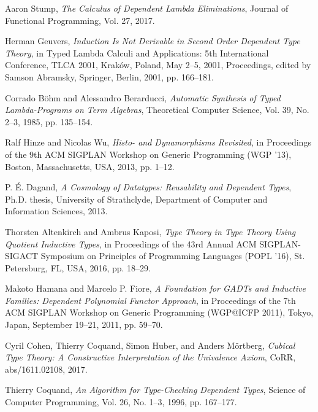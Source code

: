 \documentclass{article}
\begin{document}
\begin{thebibliography}{99}
Aaron Stump,
\textit{The Calculus of Dependent Lambda Eliminations},
Journal of Functional Programming, Vol. 27, 2017.

Herman Geuvers,
\textit{Induction Is Not Derivable in Second Order Dependent Type Theory},
in Typed Lambda Calculi and Applications: 5th International Conference, TLCA 2001, Kraków, Poland, May 2–5, 2001, Proceedings,
edited by Samson Abramsky,
Springer, Berlin, 2001, pp. 166--181.

Corrado Böhm and Alessandro Berarducci,
\textit{Automatic Synthesis of Typed Lambda-Programs on Term Algebras},
Theoretical Computer Science, Vol. 39, No. 2--3, 1985, pp. 135--154.

Ralf Hinze and Nicolas Wu,
\textit{Histo- and Dynamorphisms Revisited},
in Proceedings of the 9th ACM SIGPLAN Workshop on Generic Programming (WGP '13),
Boston, Massachusetts, USA, 2013, pp. 1--12.

P. É. Dagand,
\textit{A Cosmology of Datatypes: Reusability and Dependent Types},
Ph.D. thesis, University of Strathclyde, Department of Computer and Information Sciences, 2013.

Thorsten Altenkirch and Ambrus Kaposi,
\textit{Type Theory in Type Theory Using Quotient Inductive Types},
in Proceedings of the 43rd Annual ACM SIGPLAN-SIGACT Symposium on Principles of Programming Languages (POPL '16),
St. Petersburg, FL, USA, 2016, pp. 18--29.

Makoto Hamana and Marcelo P. Fiore,
\textit{A Foundation for GADTs and Inductive Families: Dependent Polynomial Functor Approach},
in Proceedings of the 7th ACM SIGPLAN Workshop on Generic Programming (WGP@ICFP 2011),
Tokyo, Japan, September 19–21, 2011, pp. 59--70.

Cyril Cohen, Thierry Coquand, Simon Huber, and Anders Mörtberg,
\textit{Cubical Type Theory: A Constructive Interpretation of the Univalence Axiom},
CoRR, abs/1611.02108, 2017.

Thierry Coquand,
\textit{An Algorithm for Type-Checking Dependent Types},
Science of Computer Programming, Vol. 26, No. 1–3, 1996, pp. 167--177.

\end{thebibliography}
\end{document}
